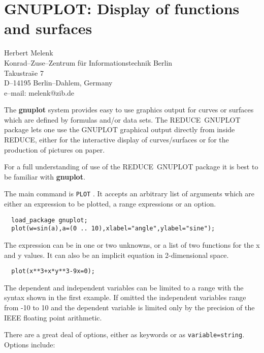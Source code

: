 \documentclass[11pt,letterpaper]{book}
\makeatletter
\newcommand{\REDUCE}{REDUCE}
\newcommand{\underscore}{\_}
\newcommand{\ttindex}[1]{{\renewcommand{\_}{\protect\underscore}%
                          \index{#1@{\tt #1}}}}
\makeatother
\begin{document}
\chapter[GNUPLOT: Plotting Functions]%
{GNUPLOT: Display of functions and surfaces}
\label{GNUPLOT}

{\footnotesize
\begin{center}
Herbert Melenk \\
Konrad--Zuse--Zentrum f\"ur Informationstechnik Berlin \\
Takustra\"se 7 \\
D--14195 Berlin--Dahlem, Germany \\[0.05in]
e--mail: melenk@zib.de
\end{center}
}
\ttindex{GNUPLOT}

The {\bf gnuplot} system provides easy to use graphics output for
curves or surfaces which are defined by formulas and/or data sets.
The \REDUCE\ GNUPLOT package lets one use the GNUPLOT graphical output
directly from inside \REDUCE, either for the interactive display of
curves/surfaces or for the production of pictures on paper.

For a full understanding of use of the \REDUCE\ GNUPLOT package it is
best to be familiar with {\bf gnuplot}.

The main command is {\tt PLOT}\ttindex{PLOT}.  It accepts an arbitrary
list of arguments which are either an expression to be plotted, a
range expressions or an option.

{\small\begin{verbatim}
  load_package gnuplot;
  plot(w=sin(a),a=(0 .. 10),xlabel="angle",ylabel="sine");
\end{verbatim}}

The expression can be in one or two unknowns, or a list of two
functions for the x and y values.  It can also be an implicit equation
in 2-dimensional space.

{\small\begin{verbatim}
  plot(x**3+x*y**3-9x=0);
\end{verbatim}}

The dependent and independent variables can be limited to a range with
the syntax shown in the first example.  If omitted the independent
variables range from -10 to 10 and the dependent variable is limited
only by the precision of the IEEE floating point arithmetic.

There are a great deal of options, either as keywords or as
{\tt variable=string}. Options include:
\end{document}
